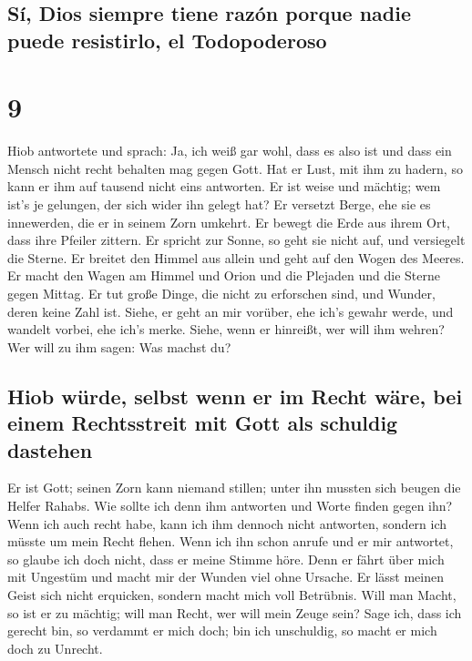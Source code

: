 \hypertarget{suxed-dios-siempre-tiene-razuxf3n-porque-nadie-puede-resistirlo-el-todopoderoso}{%
\subsection{Sí, Dios siempre tiene razón porque nadie puede resistirlo,
el
Todopoderoso}\label{suxed-dios-siempre-tiene-razuxf3n-porque-nadie-puede-resistirlo-el-todopoderoso}}

\hypertarget{section-8}{%
\section{9}\label{section-8}}

 Hiob antwortete und sprach:  Ja, ich weiß
gar wohl, dass es also ist und dass ein Mensch nicht recht behalten mag
gegen Gott.  Hat er Lust, mit ihm zu hadern, so kann er
ihm auf tausend nicht eins antworten.  Er ist weise und
mächtig; wem ist's je gelungen, der sich wider ihn gelegt hat?
 Er versetzt Berge, ehe sie es innewerden, die er in
seinem Zorn umkehrt.  Er bewegt die Erde aus ihrem Ort,
dass ihre Pfeiler zittern.  Er spricht zur Sonne, so geht
sie nicht auf, und versiegelt die Sterne.  Er breitet den
Himmel aus allein und geht auf den Wogen des Meeres.  Er
macht den Wagen am Himmel und Orion und die Plejaden und die Sterne
gegen Mittag.  Er tut große Dinge, die nicht zu
erforschen sind, und Wunder, deren keine Zahl ist. 
Siehe, er geht an mir vorüber, ehe ich's gewahr werde, und wandelt
vorbei, ehe ich's merke.  Siehe, wenn er hinreißt, wer
will ihm wehren? Wer will zu ihm sagen: Was machst du?

\hypertarget{hiob-wuxfcrde-selbst-wenn-er-im-recht-wuxe4re-bei-einem-rechtsstreit-mit-gott-als-schuldig-dastehen}{%
\subsection{Hiob würde, selbst wenn er im Recht wäre, bei einem
Rechtsstreit mit Gott als schuldig
dastehen}\label{hiob-wuxfcrde-selbst-wenn-er-im-recht-wuxe4re-bei-einem-rechtsstreit-mit-gott-als-schuldig-dastehen}}

 Er ist Gott; seinen Zorn kann niemand stillen; unter ihn
mussten sich beugen die Helfer Rahabs.  Wie sollte ich
denn ihm antworten und Worte finden gegen ihn?  Wenn ich
auch recht habe, kann ich ihm dennoch nicht antworten, sondern ich
müsste um mein Recht flehen.  Wenn ich ihn schon anrufe
und er mir antwortet, so glaube ich doch nicht, dass er meine Stimme
höre.  Denn er fährt über mich mit Ungestüm und macht mir
der Wunden viel ohne Ursache.  Er lässt meinen Geist sich
nicht erquicken, sondern macht mich voll Betrübnis.  Will
man Macht, so ist er zu mächtig; will man Recht, wer will mein Zeuge
sein?  Sage ich, dass ich gerecht bin, so verdammt er
mich doch; bin ich unschuldig, so macht er mich doch zu Unrecht.

